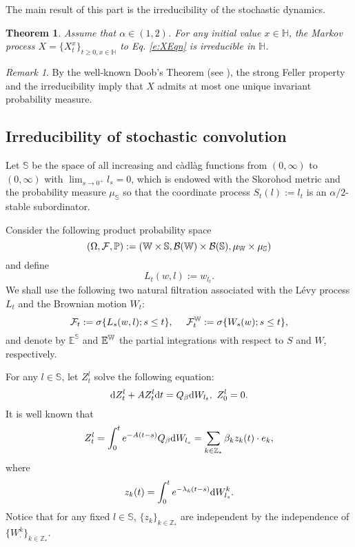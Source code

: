 \documentclass[12pt,a4paper]{article}
\newtheorem{thm}[theorem]{Theorem}
\theoremstyle{definition}
\theoremstyle{remark}
\newtheorem{remark}[theorem]{Remark}
\numberwithin{equation}{section}
\newcommand{\HH}{\mathbb{H}}
\newcommand{\Z}{\mathbb{Z}}
\newcommand{\PP}{\mathbb{P}}
\newcommand{\beq}{\begin{equation}}
\newcommand{\nneq}{\end{equation}}
\newcommand{\dif}{{\rm d}}
\def\EE{\mathbb{E}}\def\GG{\mathbb G}\def\HH{\mathbb H}\def\KK{\mathbb K}
\def\SS{\mathbb S}
\begin{document}
{The main result of this part is the irreducibility of the stochastic dynamics.
\begin{thm}\label{thm irred}
Assume that $\alpha \in (1,2)$.
For any initial value $x\in \HH$, the  Markov process $X=\{X_t^x\}_{t\ge0,x\in \HH}$ to  Eq. \eqref{e:XEqn} is irreducible in $\HH$.
\end{thm}

\begin{remark}\label{rmk} By the well-known Doob's Theorem (see \cite{DPZ96}), the strong Feller property and the irreducibility imply that  $X$ admits at most one unique invariant probability measure.   \end{remark}

\subsection{Irreducibility of stochastic convolution}

Let  $\SS$ be the space of all  increasing and c\`adl\`ag functions from $(0,\infty)$ to $(0,\infty)$ with $\lim_{s\rightarrow 0^+}l_s=0$, which is endowed with the Skorohod metric  and the probability measure $\mu_{\SS}$ so that the coordinate process
$ S_t(l):=l_t$ is an $\alpha/2$-stable subordinator.

Consider the following product probability space
$$
(\Omega, \mathcal F, \PP):=(\WW\times\SS, \mathcal B(\WW)\times\mathcal B(\SS),\mu_{\WW}\times\mu_{\SS})
$$
and define
$$
L_t(w,l):=w_{l_t}.
$$
We shall use the following two natural filtration associated with the L\' evy process $L_t$ and   the Brownian motion $W_t$:
$$
\mathcal F_t:=\sigma\{L_s(w,l);s\le t\},\  \  \  \ \mathcal F_t^{\mathbb W}:=\sigma\{W_s(w); s\le t\},
$$
and denote by   $\EE^{\SS}$  and $\EE^{\WW}$ the partial integrations with respect to $S$ and $W$, respectively.

\vskip0.3cm

For any $l\in\SS$, let $Z_t^l$ solve the following equation:
\beq\label{e Xl}
\dif Z^l_t+ A Z^l_t\dif t = Q_{\beta}\dif W_{l_t},\
Z^l_0=0.
\nneq
 It is well known that
$$
Z_t^l=\int_0^t e^{-A(t-s)}Q_{\beta} \dif W_{l_s}=\sum_{k \in \Z_{*}} \beta_k z_k(t)\cdot e_k,
$$
where $$z_{k}(t)=\int_0^t e^{-\lambda_k(t-s)}
 \dif W^k_{l_s}.$$
Notice that for any fixed $l\in\SS$, $\{z_{k}\}_{k\in \Z_{*}}$ are independent by the independence of $\{W^k_{\cdot}\}_{k\in \Z_{*}}$.

}
\end{document}
